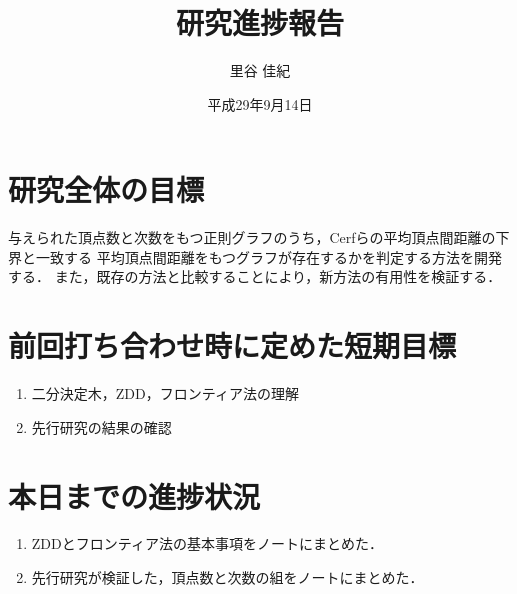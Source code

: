 \documentclass[11pt]{jarticle}
\title{研究進捗報告}
\author{里谷 佳紀}
\date{平成29年9月14日}
\begin{document}
%
\maketitle
\thispagestyle{empty}
%
\section{研究全体の目標}
与えられた頂点数と次数をもつ正則グラフのうち，Cerfらの平均頂点間距離の下界\cite{Cerf1974}と一致する
平均頂点間距離をもつグラフが存在するかを判定する方法を開発する．
また，既存の方法\cite{Yamamoto2016}と比較することにより，新方法の有用性を検証する．

\section{前回打ち合わせ時に定めた短期目標}
\begin{enumerate}
\item 二分決定木，ZDD，フロンティア法の理解
\item 先行研究の結果の確認
\end{enumerate}

\section{本日までの進捗状況}
\begin{enumerate}
\item ZDDとフロンティア法の基本事項をノートにまとめた．
\item 先行研究が検証した，頂点数と次数の組をノートにまとめた．
\end{enumerate}



\end{document}
